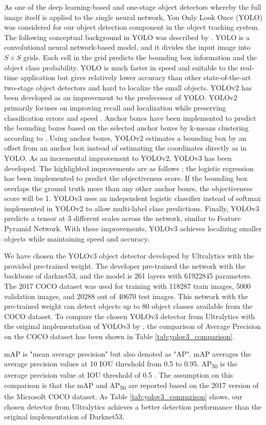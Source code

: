 As one of the deep learning-based and one-stage object detectors whereby the full image itself is applied to the single neural network, You Only Look Once (YOLO) was considered for our object detection component in the object tracking system. The following conceptual background in YOLO was described by \citeauthor{redmon_you_2016} \cite{redmon_you_2016}. YOLO is a convolutional neural network-based model, and it divides the input image into $S \times S$ grids. Each cell in the grid predicts the bounding box information and the object class probability. YOLO is much faster in speed and suitable to the real-time application but gives relatively lower accuracy than other state-of-the-art two-stage object detectors and hard to localize the small objects. YOLOv2 has been developed as an improvement to the predecessor of YOLO. YOLOv2 primarily focuses on improving recall and localization while preserving classification errors and speed \cite{redmon_yolo9000_2017}. Anchor boxes have been implemented to predict the bounding boxes based on the selected anchor boxes by k-means clustering according to \citeauthor{redmon_yolo9000_2017}. Using anchor boxes, YOLOv2 estimates a bounding box by an offset from an anchor box instead of estimating the coordinates directly as in YOLO. As an incremental improvement to YOLOv2, YOLOv3 has been developed. The highlighted improvements are as follows \cite{redmon_yolov3_2018}; the logistic regression has been implemented to predict the objectiveness score. If the bounding box overlaps the ground truth more than any other anchor boxes, the objectiveness score will be 1. YOLOv3 uses an independent logistic classifier instead of softmax implemented in YOLOv2 to allow multi-label class predictions. Finally, YOLOv3 predicts a tensor at 3 different scales across the network, similar to Feature Pyramid Network. With these improvements, YOLOv3 achieves localizing smaller objects while maintaining speed and accuracy.


We have chosen the YOLOv3 object detector developed by Ultralytics \cite{jocher_ultralyticsyolov3_2021} with the provided pre-trained weight. The developer \citeauthor{jocher_ultralyticsyolov3_2021} pre-trained the network with the backbone of darknet53, and the model is 261 layers with 61922845 parameters. The 2017 COCO dataset was used for training with 118287 train images, 5000 validation images, and 20288 out of 40670 test images. This network with the pre-trained weight can detect objects up to 80 object classes available from the COCO dataset. To compare the chosen YOLOv3 detector from Ultralytics with the original implementation of YOLOv3 by \citeauthor{redmon_yolov3_2018}, the comparison of Average Precision on the COCO dataset has been shown in Table \ref{tab:yolov3_comparison}.

mAP is "mean average precision" but also denoted as "AP". mAP averages the average precision values at 10 IOU threshold from 0.5 to 0.95. AP\textsubscript{50} is the average precision value at IOU threshold of 0.5 \cite{noauthor_coco_nodate}. The assumption on this comparison is that the mAP and AP\textsubscript{50} are reported based on the 2017 version of the Microsoft COCO dataset. As Table \ref{tab:yolov3_comparison} shows, our chosen detector from Ultralytics achieves a better detection performance than the original implementation of Darknet53.